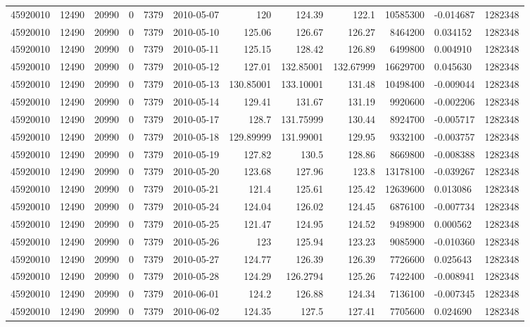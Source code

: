\begin{tabular}{l | r | r | r | r | l | r | r | r | r | l | r}
45920010 & 12490 & 20990 & 0 & 7379 & 2010-05-07 & 120 & 124.39 & 122.1 & 10585300 & -0.014687 & 1282348 \\
45920010 & 12490 & 20990 & 0 & 7379 & 2010-05-10 & 125.06 & 126.67 & 126.27 & 8464200 & 0.034152 & 1282348 \\
45920010 & 12490 & 20990 & 0 & 7379 & 2010-05-11 & 125.15 & 128.42 & 126.89 & 6499800 & 0.004910 & 1282348 \\
45920010 & 12490 & 20990 & 0 & 7379 & 2010-05-12 & 127.01 & 132.85001 & 132.67999 & 16629700 & 0.045630 & 1282348 \\
45920010 & 12490 & 20990 & 0 & 7379 & 2010-05-13 & 130.85001 & 133.10001 & 131.48 & 10498400 & -0.009044 & 1282348 \\
45920010 & 12490 & 20990 & 0 & 7379 & 2010-05-14 & 129.41 & 131.67 & 131.19 & 9920600 & -0.002206 & 1282348 \\
45920010 & 12490 & 20990 & 0 & 7379 & 2010-05-17 & 128.7 & 131.75999 & 130.44 & 8924700 & -0.005717 & 1282348 \\
45920010 & 12490 & 20990 & 0 & 7379 & 2010-05-18 & 129.89999 & 131.99001 & 129.95 & 9332100 & -0.003757 & 1282348 \\
45920010 & 12490 & 20990 & 0 & 7379 & 2010-05-19 & 127.82 & 130.5 & 128.86 & 8669800 & -0.008388 & 1282348 \\
45920010 & 12490 & 20990 & 0 & 7379 & 2010-05-20 & 123.68 & 127.96 & 123.8 & 13178100 & -0.039267 & 1282348 \\
45920010 & 12490 & 20990 & 0 & 7379 & 2010-05-21 & 121.4 & 125.61 & 125.42 & 12639600 & 0.013086 & 1282348 \\
45920010 & 12490 & 20990 & 0 & 7379 & 2010-05-24 & 124.04 & 126.02 & 124.45 & 6876100 & -0.007734 & 1282348 \\
45920010 & 12490 & 20990 & 0 & 7379 & 2010-05-25 & 121.47 & 124.95 & 124.52 & 9498900 & 0.000562 & 1282348 \\
45920010 & 12490 & 20990 & 0 & 7379 & 2010-05-26 & 123 & 125.94 & 123.23 & 9085900 & -0.010360 & 1282348 \\
45920010 & 12490 & 20990 & 0 & 7379 & 2010-05-27 & 124.77 & 126.39 & 126.39 & 7726600 & 0.025643 & 1282348 \\
45920010 & 12490 & 20990 & 0 & 7379 & 2010-05-28 & 124.29 & 126.2794 & 125.26 & 7422400 & -0.008941 & 1282348 \\
45920010 & 12490 & 20990 & 0 & 7379 & 2010-06-01 & 124.2 & 126.88 & 124.34 & 7136100 & -0.007345 & 1282348 \\
45920010 & 12490 & 20990 & 0 & 7379 & 2010-06-02 & 124.35 & 127.5 & 127.41 & 7705600 & 0.024690 & 1282348 \\

\end{tabular}

